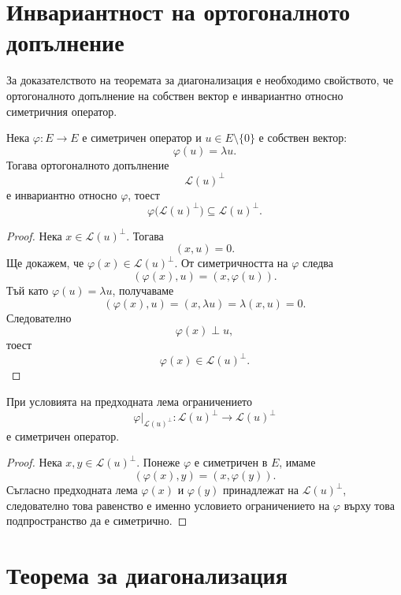 \section{Инвариантност на ортогоналното допълнение}\label{s:30.4}

За доказателството на теоремата за диагонализация е необходимо свойството, че ортогоналното допълнение на собствен вектор е инвариантно относно симетричния оператор.

\begin{lem}
Нека $\varphi:E\to E$ е симетричен оператор и $u\in E\setminus\{0\}$ е собствен вектор:
\[
\varphi(u)=\lambda u.
\]
Тогава ортогоналното допълнение
\[
\mathcal{L}(u)^\perp
\]
е инвариантно относно $\varphi$, тоест
\[
\varphi\bigl(\mathcal{L}(u)^\perp\bigr)
\subseteq
\mathcal{L}(u)^\perp.
\]
\end{lem}

\begin{proof}
Нека $x\in\mathcal{L}(u)^\perp$. Тогава
\[
(x,u)=0.
\]
Ще докажем, че $\varphi(x)\in\mathcal{L}(u)^\perp$. От симетричността на $\varphi$ следва
\[
(\varphi(x),u)=(x,\varphi(u)).
\]
Тъй като $\varphi(u)=\lambda u$, получаваме
\[
(\varphi(x),u)=(x,\lambda u)=\lambda(x,u)=0.
\]
Следователно
\[
\varphi(x)\perp u,
\]
тоест
\[
\varphi(x)\in\mathcal{L}(u)^\perp.
\]
\end{proof}

\begin{lem}
При условията на предходната лема ограничението
\[
\varphi\big|_{\mathcal{L}(u)^\perp}:
\mathcal{L}(u)^\perp\to\mathcal{L}(u)^\perp
\]
е симетричен оператор.
\end{lem}

\begin{proof}
Нека $x,y\in\mathcal{L}(u)^\perp$. Понеже $\varphi$ е симетричен в $E$, имаме
\[
(\varphi(x),y)=(x,\varphi(y)).
\]
Съгласно предходната лема $\varphi(x)$ и $\varphi(y)$ принадлежат на $\mathcal{L}(u)^\perp$, следователно това равенство е именно условието ограничението на $\varphi$ върху това подпространство да е симетрично.
\end{proof}

\section{Теорема за диагонализация}\label{s:30.5}

